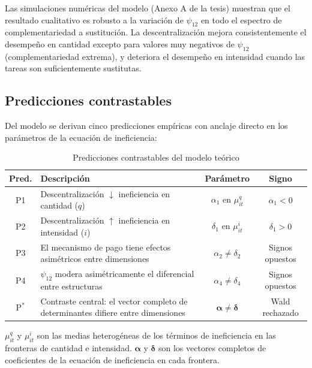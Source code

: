 \documentclass[12pt, a4paper]{article}
\newcommand{\bsym}[1]{\boldsymbol{#1}}
\begin{document}
Las simulaciones numéricas del modelo (Anexo A de la tesis) muestran que el
resultado cualitativo es robusto a la variación de $\psi_{12}$ en todo el
espectro de complementariedad a sustitución. La descentralización mejora
consistentemente el desempeño en cantidad excepto para valores muy negativos de
$\psi_{12}$ (complementariedad extrema), y deteriora el desempeño en intensidad
cuando las tareas son suficientemente sustitutas.

\subsection{Predicciones contrastables}

Del modelo se derivan cinco predicciones empíricas con anclaje directo en los
parámetros de la ecuación de ineficiencia:

\begin{table}[htbp]
\centering
\caption{Predicciones contrastables del modelo teórico}
\label{tab:predicciones}
\begin{threeparttable}
\begin{tabularx}{\linewidth}{cXcc}
\toprule
\textbf{Pred.} & \textbf{Descripción} & \textbf{Parámetro} &
\textbf{Signo} \\
\midrule
P1 & Descentralización $\downarrow$ ineficiencia en cantidad ($q$)
   & $\alpha_1$ en $\mu^q_{it}$ & $\alpha_1 < 0$ \\[3pt]
P2 & Descentralización $\uparrow$ ineficiencia en intensidad ($i$)
   & $\delta_1$ en $\mu^i_{it}$ & $\delta_1 > 0$ \\[3pt]
P3 & El mecanismo de pago tiene efectos asimétricos entre dimensiones
   & $\alpha_2 \neq \delta_2$ & Signos opuestos \\[3pt]
P4 & $\psi_{12}$ modera asimétricamente el diferencial entre estructuras
   & $\alpha_4 \neq \delta_4$ & Signos opuestos \\[3pt]
P$^*$ & Contraste central: el vector completo de determinantes
         difiere entre dimensiones
   & $\bsym{\alpha} \neq \bsym{\delta}$ & Wald rechazado \\
\bottomrule
\end{tabularx}
\begin{tablenotes}
  \small
  \item $\mu^q_{it}$ y $\mu^i_{it}$ son las medias heterogéneas de los
    términos de ineficiencia en las fronteras de cantidad e intensidad.
    $\bsym{\alpha}$ y $\bsym{\delta}$ son los vectores completos de
    coeficientes de la ecuación de ineficiencia en cada frontera.
\end{tablenotes}
\end{threeparttable}
\end{table}
\end{document}
